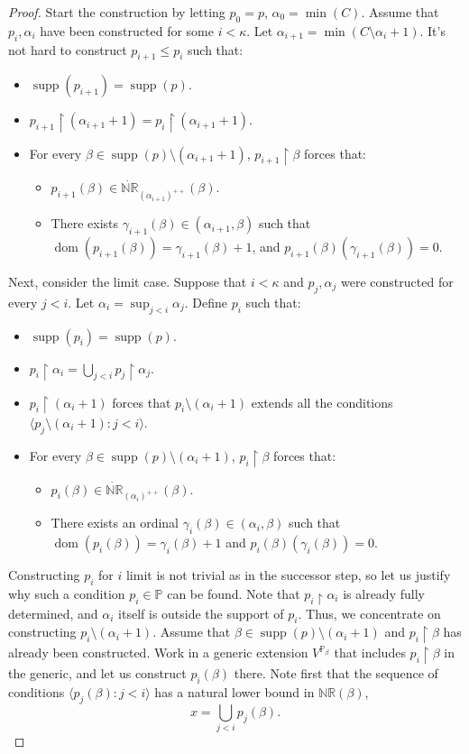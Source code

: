 \documentclass[11pt]{amsart}
\renewcommand{\restriction}{\mathbin\upharpoonright}    %
\theoremstyle{definition}
\newcounter{condition}
\theoremstyle{remark}
\newcommand\<{{<}}
\DeclareMathOperator{\supp}{supp}
\newcommand{\dom}{\mathop{\mathrm{dom}}\nolimits}
\newcommand{\po}{\mathbb{P}}
\newcommand{\la}{\langle}
\newcommand{\ra}{\rangle}
\begin{document}
\begin{proof}
    Start the construction by letting $p_0 = p$, $\alpha_0 = \min(C)$. Assume that $p_i, \alpha_i$ have been constructed for some $i<\kappa$. Let $\alpha_{i+1} = \min(C \setminus \alpha_i+1)$. It's not hard to construct $p_{i+1}\leq p_i$ such that:
    \begin{itemize}
        \item $\supp(p_{i+1})= \supp(p)$.
        \item $p_{i+1}\restriction (\alpha_{i+1}+1)= p_i \restriction (\alpha_{i+1}+1)$.
        \item For every $\beta\in \supp(p)\setminus (\alpha_{i+1}+1)$, $p_{i+1}\restriction \beta$ forces that:
        \begin{itemize}
            \item $p_{i+1}(\beta)\in \dot{\mathbb{NR}}_{(\alpha_{i+1})^{++}}(\beta).$
            \item There exists $\gamma_{i+1}(\beta)\in (\alpha_{i+1}, \beta)$ such that $\dom(p_{i+1}(\beta)) = \gamma_{i+1}(\beta)+1$, and $p_{i+1}(\beta)(\gamma_{i+1}(\beta)) =0$. 
        \end{itemize}
    \end{itemize}
    Next, consider the limit case. Suppose that $i<\kappa$ and $p_j, \alpha_j$ were constructed for every $j<i$. Let $\alpha_i = \sup_{j<i}\alpha_j$. Define $p_i$ such that:
    \begin{itemize}
        \item $\supp(p_i)= \supp(p)$.
        \item $p_{i}\restriction \alpha_i = \bigcup_{j<i} p_j\restriction \alpha_j$.
        \item $p_{i}\restriction (\alpha_{i}+1)$ forces that $p_{i}\setminus (\alpha_i+1)$ extends all the conditions $\la p_j\setminus (\alpha_i+1) \colon j<i \ra$. 
        \item For every $\beta\in \supp(p)\setminus (\alpha_i+1)$, $p_{i}\restriction \beta$ forces that:
        \begin{itemize}
            \item $p_i(\beta)\in \dot{\mathbb{NR}}_{(\alpha_i)^{++}}(\beta).$
            \item There exists an ordinal $\gamma_i(\beta)\in (\alpha_i, \beta)$ such that $\dom(p_i(\beta)) = \gamma_i(\beta)+1$ and $p_i(\beta)(\gamma_i(\beta)) = 0$.
        \end{itemize}
    \end{itemize}
    Constructing $p_i$ for $i$ limit is not trivial as in the successor step, so let us justify why such a condition $p_i\in \po$ can be found. Note that $p_{i}\restriction \alpha_i$ is already fully determined, and $\alpha_i$ itself is outside the support of $p_i$. Thus, we concentrate on constructing $p_i\setminus (\alpha_i+1)$. Assume that $\beta\in \supp(p)\setminus (\alpha_i+1)$ and $p_i\restriction \beta$ has already been constructed. Work in a generic extension $V^{\po_\beta}$ that includes $p_i\restriction \beta$ in the generic, and let us construct $p_i(\beta)$ there. Note first that the sequence of conditions $\la p_j(\beta) \colon j<i \ra$ has a natural lower bound in $\mathbb{NR}(\beta)$, $$x = \bigcup_{j<i}p_j(\beta).$$

\end{proof}
\end{document}
